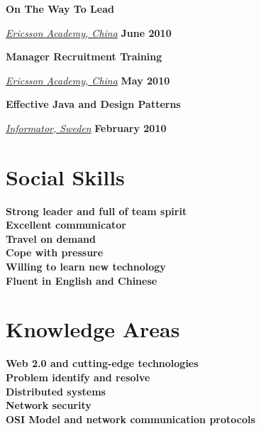 \textbf{On The Way To Lead}
\begin{outerlist}
\item[] \href{http://www.ericssonacademy.com/}{\textit{Ericsson Academy, China}}
        \hfill \textbf{June 2010}
\end{outerlist}
\blankline

\textbf{Manager Recruitment Training}
\begin{outerlist}
\item[] \href{http://www.ericssonacademy.com/}{\textit{Ericsson Academy, China}}
        \hfill \textbf{May 2010}
\end{outerlist}
\blankline

\textbf{Effective Java and Design Patterns}
\begin{outerlist}
\item[] \href{http://www.informator.se/}{\textit{Informator, Sweden}}
        \hfill \textbf{February 2010}
\end{outerlist}


\section{Social Skills}
{\textbf{Strong leader and full of team spirit}}\\
{\textbf{Excellent communicator}}\\
{\textbf{Travel on demand}}\\
{\textbf{Cope with pressure}}\\
{\textbf{Willing to learn new technology}}\\
{\textbf{Fluent in English and Chinese}}\\


\section{Knowledge Areas}
{\textbf{Web 2.0 and cutting-edge technologies}}\\
{\textbf{Problem identify and resolve}}\\
{\textbf{Distributed systems}}\\ 
{\textbf{Network security}}\\ 
{\textbf{OSI Model and network communication protocols}}\\


